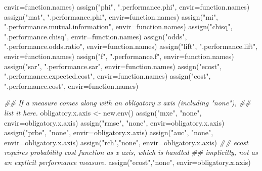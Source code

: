 \documentclass[
  letterpaper,
  DIV=11,
  numbers=noendperiod]{scrartcl}
\newenvironment{Shaded}{\begin{snugshade}}{\end{snugshade}}
\newcommand{\AttributeTok}[1]{\textcolor[rgb]{0.40,0.45,0.13}{#1}}
\newcommand{\DocumentationTok}[1]{\textcolor[rgb]{0.37,0.37,0.37}{\textit{#1}}}
\newcommand{\FunctionTok}[1]{\textcolor[rgb]{0.28,0.35,0.67}{#1}}
\newcommand{\NormalTok}[1]{\textcolor[rgb]{0.00,0.23,0.31}{#1}}
\newcommand{\OtherTok}[1]{\textcolor[rgb]{0.00,0.23,0.31}{#1}}
\newcommand{\StringTok}[1]{\textcolor[rgb]{0.13,0.47,0.30}{#1}}
\begin{document}
\begin{Shaded}
\begin{Highlighting}[]
           \AttributeTok{envir=}\NormalTok{function.names)}
    \FunctionTok{assign}\NormalTok{(}\StringTok{"phi"}\NormalTok{, }\StringTok{".performance.phi"}\NormalTok{, }\AttributeTok{envir=}\NormalTok{function.names)}
    \FunctionTok{assign}\NormalTok{(}\StringTok{"mat"}\NormalTok{, }\StringTok{".performance.phi"}\NormalTok{, }\AttributeTok{envir=}\NormalTok{function.names)}
    \FunctionTok{assign}\NormalTok{(}\StringTok{"mi"}\NormalTok{, }\StringTok{".performance.mutual.information"}\NormalTok{, }\AttributeTok{envir=}\NormalTok{function.names)}
    \FunctionTok{assign}\NormalTok{(}\StringTok{"chisq"}\NormalTok{, }\StringTok{".performance.chisq"}\NormalTok{, }\AttributeTok{envir=}\NormalTok{function.names)}
    \FunctionTok{assign}\NormalTok{(}\StringTok{"odds"}\NormalTok{, }\StringTok{".performance.odds.ratio"}\NormalTok{, }\AttributeTok{envir=}\NormalTok{function.names)}
    \FunctionTok{assign}\NormalTok{(}\StringTok{"lift"}\NormalTok{, }\StringTok{".performance.lift"}\NormalTok{, }\AttributeTok{envir=}\NormalTok{function.names)}
    \FunctionTok{assign}\NormalTok{(}\StringTok{"f"}\NormalTok{, }\StringTok{".performance.f"}\NormalTok{, }\AttributeTok{envir=}\NormalTok{function.names)}
    \FunctionTok{assign}\NormalTok{(}\StringTok{"sar"}\NormalTok{, }\StringTok{".performance.sar"}\NormalTok{, }\AttributeTok{envir=}\NormalTok{function.names)}
    \FunctionTok{assign}\NormalTok{(}\StringTok{"ecost"}\NormalTok{, }\StringTok{".performance.expected.cost"}\NormalTok{, }\AttributeTok{envir=}\NormalTok{function.names)}
    \FunctionTok{assign}\NormalTok{(}\StringTok{"cost"}\NormalTok{, }\StringTok{".performance.cost"}\NormalTok{, }\AttributeTok{envir=}\NormalTok{function.names)}

    \DocumentationTok{\#\# If a measure comes along with an obligatory x axis (including "none"),}
    \DocumentationTok{\#\# list it here.}
\NormalTok{    obligatory.x.axis }\OtherTok{\textless{}{-}} \FunctionTok{new.env}\NormalTok{()}
    \FunctionTok{assign}\NormalTok{(}\StringTok{"mxe"}\NormalTok{, }\StringTok{"none"}\NormalTok{, }\AttributeTok{envir=}\NormalTok{obligatory.x.axis)}
    \FunctionTok{assign}\NormalTok{(}\StringTok{"rmse"}\NormalTok{, }\StringTok{"none"}\NormalTok{, }\AttributeTok{envir=}\NormalTok{obligatory.x.axis)}
    \FunctionTok{assign}\NormalTok{(}\StringTok{"prbe"}\NormalTok{, }\StringTok{"none"}\NormalTok{, }\AttributeTok{envir=}\NormalTok{obligatory.x.axis)}
    \FunctionTok{assign}\NormalTok{(}\StringTok{"auc"}\NormalTok{, }\StringTok{"none"}\NormalTok{, }\AttributeTok{envir=}\NormalTok{obligatory.x.axis)}
    \FunctionTok{assign}\NormalTok{(}\StringTok{"rch"}\NormalTok{,}\StringTok{"none"}\NormalTok{, }\AttributeTok{envir=}\NormalTok{obligatory.x.axis)}
    \DocumentationTok{\#\# ecost requires probability cost function as x axis, which is handled}
    \DocumentationTok{\#\# implicitly, not as an explicit performance measure.}
    \FunctionTok{assign}\NormalTok{(}\StringTok{"ecost"}\NormalTok{,}\StringTok{"none"}\NormalTok{, }\AttributeTok{envir=}\NormalTok{obligatory.x.axis)  }
    

\end{Highlighting}
\end{Shaded}
\end{document}
